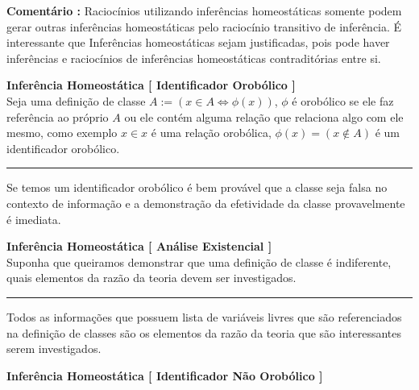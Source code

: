 \documentclass[10pt,a4paper]{report}
\begin{document}
\textbf{Comentário :} Raciocínios utilizando inferências homeostáticas somente podem gerar outras inferências homeostáticas pelo raciocínio transitivo de inferência. É interessante que Inferências homeostáticas sejam justificadas, pois pode haver inferências e raciocínios de inferências homeostáticas contraditórias entre si.

% 
\hspace{\baselineskip}

\textbf{Inferência Homeostática [ Identificador Orobólico ]}\\

Seja uma definição de classe $A := ( x \in A \iff \phi(x) )$, $\phi$ é orobólico se ele faz referência ao próprio $A$ ou ele contém alguma relação que relaciona algo com ele mesmo, como exemplo $x \in x$ é uma relação orobólica, $\phi(x) = (x \notin A )$ é um identificador orobólico.\\
\hrule 

\hspace{\baselineskip}

Se temos um identificador orobólico é bem provável que a classe seja falsa no contexto de informação e a demonstração da efetividade da classe provavelmente é imediata.

% 
\hspace{\baselineskip}

\textbf{Inferência Homeostática [ Análise Existencial ]}\\

Suponha que queiramos demonstrar que uma definição de classe é indiferente, quais elementos da razão da teoria devem ser investigados.\\
\hrule 

\hspace{\baselineskip}

Todos as informações que possuem lista de variáveis livres que são referenciados na definição de classes são os elementos da razão da teoria que são interessantes serem investigados.

% 
\hspace{\baselineskip}

\textbf{Inferência Homeostática [ Identificador Não Orobólico ]}\\
\end{document}
